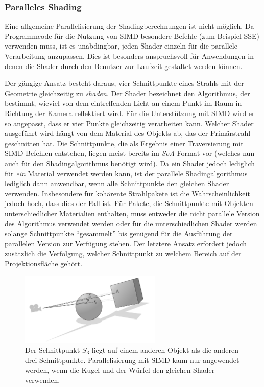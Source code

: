 \subsubsection{Paralleles Shading}

Eine allgemeine Parallelisierung der Shadingberechnungen ist nicht möglich. Da Programmcode für die Nutzung von SIMD besondere Befehle (zum Beispiel SSE) verwenden muss, ist es unabdingbar, jeden Shader einzeln für die parallele Verarbeitung anzupassen. Dies ist besonders anspruchsvoll für Anwendungen in denen die Shader durch den Benutzer zur Laufzeit gestaltet werden können.

Der gängige Ansatz besteht daraus, vier Schnittpunkte eines Strahls mit der Geometrie gleichzeitig zu \textit{shaden}. Der Shader bezeichnet den Algorithmus, der bestimmt, wieviel von dem eintreffenden Licht an einem Punkt im Raum in Richtung der Kamera reflektiert wird. Für die Unterstützung mit SIMD wird er so angepasst, dass er vier Punkte gleichzeitig verarbeiten kann.
Welcher Shader ausgeführt wird hängt von dem Material des Objekts ab, das der Primärstrahl geschnitten hat. Die Schnittpunkte, die als Ergebnis einer Traversierung mit SIMD Befehlen entstehen, liegen meist bereits im \textit{SoA}-Format vor (welches nun auch für den Shadingalgorithmus benötigt wird). Da ein Shader jedoch lediglich für \textit{ein} Material verwendet werden kann, ist der parallele Shadingalgorithmus lediglich dann anwendbar, wenn alle Schnittpunkte den gleichen Shader verwenden. Insbesondere für kohärente Strahlpakete ist die Wahrscheinlichkeit jedoch hoch, dass dies der Fall ist.
Für Pakete, die Schnittpunkte mit Objekten unterschiedlicher Materialien enthalten, muss entweder die nicht parallele Version des Algorithmus verwendet werden oder für die unterschiedlichen Shader werden solange Schnittpunkte ``gesammelt'' bis genügend für die Ausführung der parallelen Version zur Verfügung stehen. Der letztere Ansatz erfordert jedoch zusätzlich die Verfolgung, welcher Schnittpunkt zu welchem Bereich auf der Projektionsfläche gehört.

\begin{figure}\centering
\includegraphics[width=0.6\textwidth]{images/simdshade.pdf} 
\caption[Strahlpaket schneidet unterschiedliche Objekte]{Der Schnittpunkt $S_3$ liegt auf einem anderen Objekt als die anderen drei Schnittpunkte. Parallelisierung mit SIMD kann nur angewendet werden, wenn die Kugel und der Würfel den gleichen Shader verwenden.}
\label{fig:simdshade}
\end{figure}


